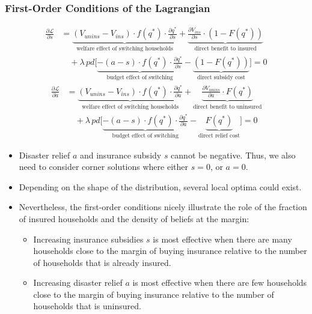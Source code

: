 \documentclass[12pt]{article}
\begin{document}
\subsubsection*{First-Order Conditions of the Lagrangian}
\begin{align*}
    \frac{\partial \mathcal{L}}{\partial s} &= \underbrace{(V_{unins} - V_{ins}) \cdot f(q^*) \cdot \frac{\partial q^*}{\partial s}}_{\text{welfare effect of switching households}} + \underbrace{\frac{\partial V_{ins}}{\partial s} \cdot (1 - F(q^*))}_{\text{direct benefit to insured}} \\[8pt]
    &\quad + \lambda \, pd \Biggl[ \underbrace{-(a - s) \cdot f(q^*) \cdot \frac{\partial q^*}{\partial s}}_{\text{budget effect of switching}} - \underbrace{(1 - F(q^*))}_{\text{direct subsidy cost}} \Biggr] = 0
\end{align*}
\begin{align*}
    \frac{\partial \mathcal{L}}{\partial a} &= \underbrace{(V_{unins} - V_{ins}) \cdot f(q^*) \cdot \frac{\partial q^*}{\partial a}}_{\text{welfare effect of switching households}} + \underbrace{\frac{\partial V_{unins}}{\partial a} \cdot F(q^*)}_{\text{direct benefit to uninsured}} \\[8pt]
    &\quad + \lambda \, pd \Biggl[ \underbrace{-(a - s) \cdot f(q^*) \cdot \frac{\partial q^*}{\partial a}}_{\text{budget effect of switching}} - \underbrace{F(q^*)}_{\text{direct relief cost}} \Biggr] = 0
\end{align*}

\begin{itemize}
    \item Disaster relief $a$ and insurance subsidy $s$ cannot be negative. Thus, we also need to consider corner solutions where either $s=0$, or $a=0$.
    \item Depending on the shape of the distribution, several local optima could exist.
    \item Nevertheless, the first-order conditions nicely illustrate the role of the fraction of insured households and the density of beliefs at the margin:
    \begin{itemize}
        \item Increasing insurance subsidies $s$ is most effective when there are many households close to the margin of buying insurance relative to the number of households that is already insured.
        \item Increasing disaster relief $a$ is most effective when there are few households close to the margin of buying insurance relative to the number of households that is uninsured.
    \end{itemize}
\end{itemize}
\end{document}
